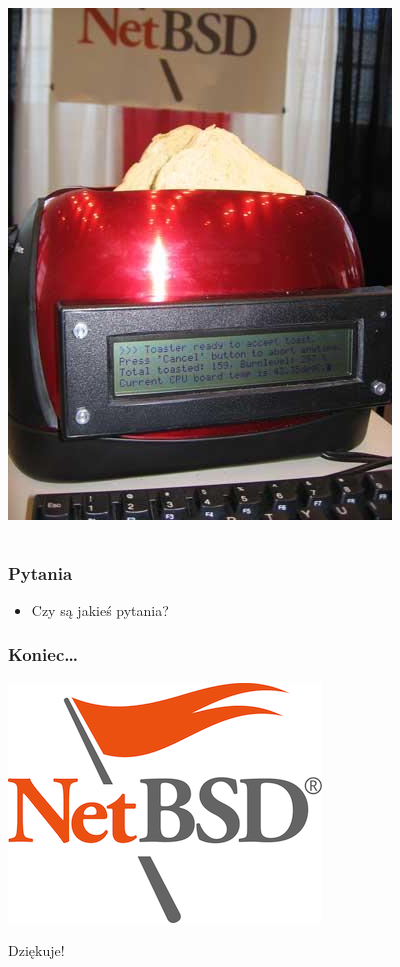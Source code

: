 \documentclass[dvipsnames,table]{beamer}
\begin{document}
\begin{frame}
\begin{columns}[c]
\column{1.5in}
	\includegraphics[scale=0.4]{img_netbsdtoaster.jpg}
\end{columns}

\end{frame}

\begin{frame}
\frametitle{Pytania}
\begin{itemize}
	\item Czy są jakieś pytania?
\end{itemize}
\end{frame}

\begin{frame}
\frametitle{Koniec\ldots}
\vspace*{-0.8cm}
\begin{center}
\includegraphics[scale=0.5]{NetBSD.png}

Dziękuje!
\end{center}
\end{frame}

 
\end{document}
